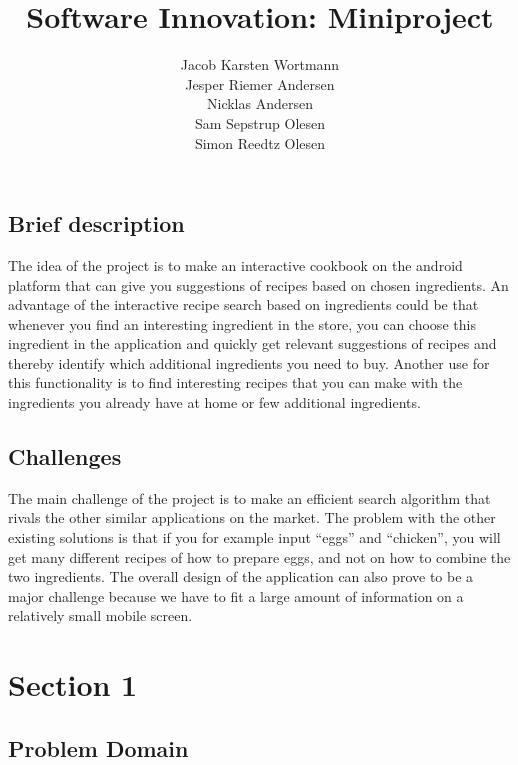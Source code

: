 

\title{Software Innovation: Miniproject}
\author{Jacob Karsten Wortmann\\Jesper Riemer Andersen\\Nicklas Andersen\\Sam Sepstrup Olesen\\Simon Reedtz Olesen}


\maketitle

\subsection*{Brief description}
The idea of the project is to make an interactive cookbook on the android platform that can give you suggestions of recipes based on chosen ingredients. An advantage of the interactive recipe search based on ingredients could be that whenever you find an interesting ingredient in the store, you can choose this ingredient in the application and quickly get relevant suggestions of recipes and thereby identify which additional ingredients you need to buy. Another use for this functionality is to find interesting recipes that you can make with the ingredients you already have at home or few additional ingredients.

\subsection*{Challenges}
The main challenge of the project is to make an efficient search algorithm that rivals the other similar applications on the market. The problem with the other existing solutions is that if you for example input ``eggs'' and ``chicken'', you will get many different recipes of how to prepare eggs, and not on how to combine the two ingredients. The overall design of the application can also prove to be a major challenge because we have to fit a large amount of information on a relatively small mobile screen.

\section*{Section 1}

\subsection*{Problem Domain}


